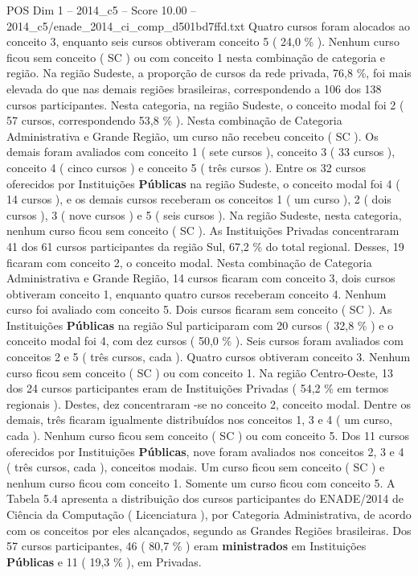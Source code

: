 \begin{textsample}{POS Dim 1 – 2014\_c5 – Score 10.00 – 2014\_c5/enade\_2014\_ci\_comp\_d501bd7ffd.txt}
Quatro cursos foram alocados ao conceito 3, enquanto seis cursos obtiveram conceito 5 ( 24,0 \% ).
Nenhum curso ficou sem conceito ( SC ) ou com conceito 1 nesta combinação de categoria e região.
Na região Sudeste, a proporção de cursos da rede privada, 76,8 \%, foi mais elevada do que nas demais regiões brasileiras, correspondendo a 106 dos 138 cursos participantes.
Nesta categoria, na região Sudeste, o conceito modal foi 2 ( 57 cursos, correspondendo 53,8 \% ).
Nesta combinação de Categoria Administrativa e Grande Região, um curso não recebeu conceito ( SC ).
Os demais foram avaliados com conceito 1 ( sete cursos ), conceito 3 ( 33 cursos ), conceito 4 ( cinco cursos ) e conceito 5 ( três cursos ).
Entre os 32 cursos oferecidos por Instituições \textbf{Públicas} na região Sudeste, o conceito modal foi 4 ( 14 cursos ), e os demais cursos receberam os conceitos 1 ( um curso ), 2 ( dois cursos ), 3 ( nove cursos ) e 5 ( seis cursos ).
Na região Sudeste, nesta categoria, nenhum curso ficou sem conceito ( SC ).
As Instituições Privadas concentraram 41 dos 61 cursos participantes da região Sul, 67,2 \% do total regional.
Desses, 19 ficaram com conceito 2, o conceito modal.
Nesta combinação de Categoria Administrativa e Grande Região, 14 cursos ficaram com conceito 3, dois cursos obtiveram conceito 1, enquanto quatro cursos receberam conceito 4.
Nenhum curso foi avaliado com conceito 5.
Dois cursos ficaram sem conceito ( SC ).
As Instituições \textbf{Públicas} na região Sul participaram com 20 cursos ( 32,8 \% ) e o conceito modal foi 4, com dez cursos ( 50,0 \% ).
Seis cursos foram avaliados com conceitos 2 e 5 ( três cursos, cada ).
Quatro cursos obtiveram conceito 3.
Nenhum curso ficou sem conceito ( SC ) ou com conceito 1.
Na região Centro-Oeste, 13 dos 24 cursos participantes eram de Instituições Privadas ( 54,2 \% em termos regionais ).
Destes, dez concentraram -se no conceito 2, conceito modal.
Dentre os demais, três ficaram igualmente distribuídos nos conceitos 1, 3 e 4 ( um curso, cada ).
Nenhum curso ficou sem conceito ( SC ) ou com conceito 5.
Dos 11 cursos oferecidos por Instituições \textbf{Públicas}, nove foram avaliados nos conceitos 2, 3 e 4 ( três cursos, cada ), conceitos modais.
Um curso ficou sem conceito ( SC ) e nenhum curso ficou com conceito 1.
Somente um curso ficou com conceito 5.
A Tabela 5.4 apresenta a distribuição dos cursos participantes do ENADE/2014 de Ciência da Computação ( Licenciatura ), por Categoria Administrativa, de acordo com os conceitos por eles alcançados, segundo as Grandes Regiões brasileiras.
Dos 57 cursos participantes, 46 ( 80,7 \% ) eram \textbf{ministrados} em Instituições \textbf{Públicas} e 11 ( 19,3 \% ), em Privadas.

\end{textsample}
